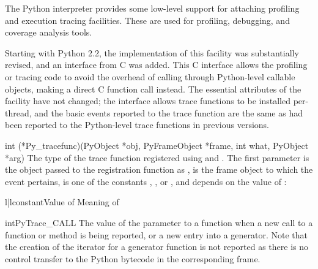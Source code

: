 The Python interpreter provides some low-level support for attaching
profiling and execution tracing facilities.  These are used for
profiling, debugging, and coverage analysis tools.

Starting with Python 2.2, the implementation of this facility was
substantially revised, and an interface from C was added.  This C
interface allows the profiling or tracing code to avoid the overhead
of calling through Python-level callable objects, making a direct C
function call instead.  The essential attributes of the facility have
not changed; the interface allows trace functions to be installed
per-thread, and the basic events reported to the trace function are
the same as had been reported to the Python-level trace functions in
previous versions.

\begin{ctypedesc}[Py_tracefunc]{int (*Py_tracefunc)(PyObject *obj,
                                PyFrameObject *frame, int what,
                                PyObject *arg)}
  The type of the trace function registered using
   and .
  The first parameter is the object passed to the registration
  function as ,  is the frame object to which the
  event pertains,  is one of the constants
  , ,
   or , and 
  depends on the value of :

  \begin{tableii}{l|l}{constant}{Value of }{Meaning of }
  \end{tableii}
\end{ctypedesc}

\begin{cvardesc}{int}{PyTrace_CALL}
  The value of the  parameter to a 
  function when a new call to a function or method is being reported,
  or a new entry into a generator.  Note that the creation of the
  iterator for a generator function is not reported as there is no
  control transfer to the Python bytecode in the corresponding frame.
\end{cvardesc}

